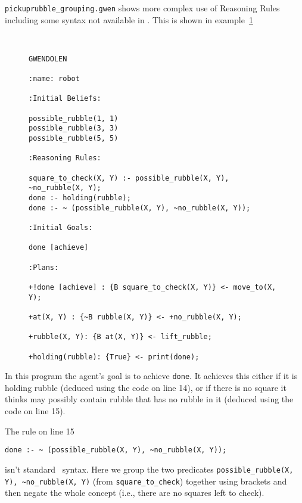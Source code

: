 \texttt{pickuprubble\_grouping.gwen} shows more complex use of Reasoning Rules including some syntax not available in \prolog.  This is shown in example~\ref{code:pickuprubble_grouping}
\begin{figure}[htb]
\begin{ourexample}
\label{code:pickuprubble_grouping} \quad \\
\begin{lstlisting}[basicstyle=\sffamily,style=easslisting,language=Gwendolen]
GWENDOLEN

:name: robot

:Initial Beliefs:

possible_rubble(1, 1)
possible_rubble(3, 3)
possible_rubble(5, 5)

:Reasoning Rules:

square_to_check(X, Y) :- possible_rubble(X, Y), ~no_rubble(X, Y);
done :- holding(rubble);
done :- ~ (possible_rubble(X, Y), ~no_rubble(X, Y));

:Initial Goals:

done [achieve]

:Plans:

+!done [achieve] : {B square_to_check(X, Y)} <- move_to(X, Y);

+at(X, Y) : {~B rubble(X, Y)} <- +no_rubble(X, Y);

+rubble(X, Y): {B at(X, Y)} <- lift_rubble;

+holding(rubble): {True} <- print(done);
\end{lstlisting}
\end{ourexample}
\end{figure}

In this program the agent's goal is to achieve \lstinline{done}.  It achieves this either if it is holding rubble (deduced using the code on line 14), or if there is no square it thinks may possibly contain rubble that has no rubble in it (deduced using the code on line 15).

\begin{sloppypar}
The rule on line 15
\begin{verbatim}
done :- ~ (possible_rubble(X, Y), ~no_rubble(X, Y));
\end{verbatim}
isn't standard \prolog\ syntax.  Here we group the two predicates \lstinline{possible_rubble(X, Y), ~no_rubble(X, Y)} (from \lstinline{square_to_check}) together using brackets and then negate the whole concept (i.e., there are no squares left to check).
\end{sloppypar}

